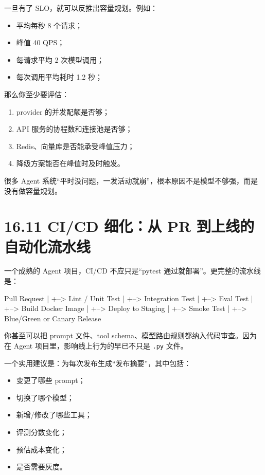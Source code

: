 一旦有了 SLO，就可以反推出容量规划。例如：


\begin{itemize}[leftmargin=2em]
\item 平均每秒 8 个请求；
\item 峰值 40 QPS；
\item 每请求平均 2 次模型调用；
\item 每次调用平均耗时 1.2 秒；
\end{itemize}

那么你至少要评估：


\begin{enumerate}[leftmargin=2em]
\item provider 的并发配额是否够；
\item API 服务的协程数和连接池是否够；
\item Redis、向量库是否能承受峰值压力；
\item 降级方案能否在峰值时及时触发。
\end{enumerate}

很多 Agent 系统``平时没问题，一发活动就崩''，根本原因不是模型不够强，而是没有做容量规划。


\section{16.11 CI/CD 细化：从 PR 到上线的自动化流水线}

一个成熟的 Agent 项目，CI/CD 不应只是``pytest 通过就部署''。更完整的流水线是：


\begin{codeblock}
Pull Request
   |
   +--> Lint / Unit Test
   |
   +--> Integration Test
   |
   +--> Eval Test
   |
   +--> Build Docker Image
   |
   +--> Deploy to Staging
   |
   +--> Smoke Test
   |
   +--> Blue/Green or Canary Release
\end{codeblock}

你甚至可以把 prompt 文件、tool schema、模型路由规则都纳入代码审查。因为在 Agent 项目里，影响线上行为的早已不只是 \texttt{.py} 文件。


一个实用建议是：为每次发布生成``发布摘要''，其中包括：


\begin{itemize}[leftmargin=2em]
\item 变更了哪些 prompt；
\item 切换了哪个模型；
\item 新增/修改了哪些工具；
\item 评测分数变化；
\item 预估成本变化；
\item 是否需要灰度。
\end{itemize}

